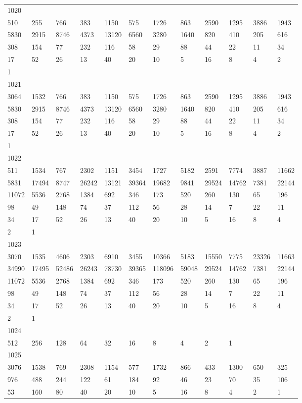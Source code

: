 \begin{longtable}{llllllllllll}
1020&&&&&&&&&&&\\
510& 255& 766& 383& 1150& 575& 1726& 863& 2590& 1295& 3886& 1943\\
5830& 2915& 8746& 4373& 13120& 6560& 3280& 1640& 820& 410& 205& 616\\
308& 154& 77& 232& 116& 58& 29& 88& 44& 22& 11& 34\\
17& 52& 26& 13& 40& 20& 10& 5& 16& 8& 4& 2\\
1& \\

1021&&&&&&&&&&&\\
3064& 1532& 766& 383& 1150& 575& 1726& 863& 2590& 1295& 3886& 1943\\
5830& 2915& 8746& 4373& 13120& 6560& 3280& 1640& 820& 410& 205& 616\\
308& 154& 77& 232& 116& 58& 29& 88& 44& 22& 11& 34\\
17& 52& 26& 13& 40& 20& 10& 5& 16& 8& 4& 2\\
1& \\

1022&&&&&&&&&&&\\
511& 1534& 767& 2302& 1151& 3454& 1727& 5182& 2591& 7774& 3887& 11662\\
5831& 17494& 8747& 26242& 13121& 39364& 19682& 9841& 29524& 14762& 7381& 22144\\
11072& 5536& 2768& 1384& 692& 346& 173& 520& 260& 130& 65& 196\\
98& 49& 148& 74& 37& 112& 56& 28& 14& 7& 22& 11\\
34& 17& 52& 26& 13& 40& 20& 10& 5& 16& 8& 4\\
2& 1& \\

1023&&&&&&&&&&&\\
3070& 1535& 4606& 2303& 6910& 3455& 10366& 5183& 15550& 7775& 23326& 11663\\
34990& 17495& 52486& 26243& 78730& 39365& 118096& 59048& 29524& 14762& 7381& 22144\\
11072& 5536& 2768& 1384& 692& 346& 173& 520& 260& 130& 65& 196\\
98& 49& 148& 74& 37& 112& 56& 28& 14& 7& 22& 11\\
34& 17& 52& 26& 13& 40& 20& 10& 5& 16& 8& 4\\
2& 1& \\

1024&&&&&&&&&&&\\
512& 256& 128& 64& 32& 16& 8& 4& 2& 1& \\

1025&&&&&&&&&&&\\
3076& 1538& 769& 2308& 1154& 577& 1732& 866& 433& 1300& 650& 325\\
976& 488& 244& 122& 61& 184& 92& 46& 23& 70& 35& 106\\
53& 160& 80& 40& 20& 10& 5& 16& 8& 4& 2& 1\\


\end{longtable}
